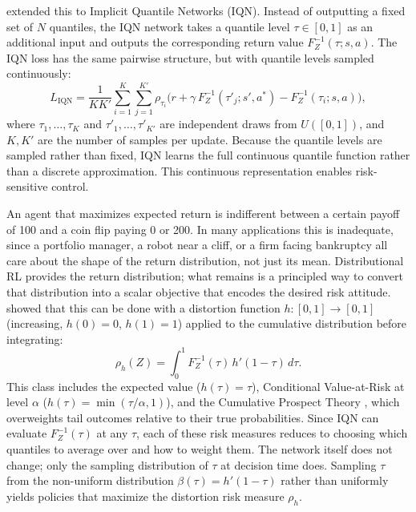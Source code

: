 \citet{Dabney2018b} extended this to Implicit Quantile Networks (IQN).
Instead of outputting a fixed set of $N$ quantiles, the IQN network takes
a quantile level $\tau \in [0,1]$ as an additional input and outputs the
corresponding return value $F_{Z}^{-1}(\tau; s,a)$. The IQN loss has
the same pairwise structure, but with quantile levels sampled
continuously:
\begin{equation}
  L_{\text{IQN}} = \frac{1}{KK'} \sum_{i=1}^{K} \sum_{j=1}^{K'}
  \rho_{\tau_i}\bigl(
    r + \gamma\, F_{Z}^{-1}(\tau'_j; s', a^*)
    - F_{Z}^{-1}(\tau_i; s, a)
  \bigr),
  \label{eq:iqn_loss}
\end{equation}
where $\tau_1, \ldots, \tau_K$ and $\tau'_1, \ldots, \tau'_{K'}$ are
independent draws from $U([0,1])$, and $K, K'$ are the number of
samples per update. Because the quantile levels are sampled rather than
fixed, IQN learns the full continuous quantile function rather than a
discrete approximation. This continuous representation enables risk-sensitive control.

An agent that maximizes expected return is indifferent between a certain
payoff of 100 and a coin flip paying 0 or 200. In many applications this
is inadequate, since a portfolio manager, a robot near a cliff, or a firm
facing bankruptcy all care about the shape of the return distribution, not
just its mean. Distributional RL provides the return distribution; what
remains is a principled way to convert that distribution into a scalar
objective that encodes the desired risk attitude. \citet{Yaari1987}
showed that this can be done with a distortion function
$h: [0,1] \to [0,1]$ (increasing, $h(0)=0$, $h(1)=1$) applied to the
cumulative distribution before integrating:
\begin{equation}
  \rho_h(Z) = \int_0^1 F_Z^{-1}(\tau) \, h'(1-\tau) \, d\tau.
  \label{eq:distortion_risk}
\end{equation}
This class includes the expected value ($h(\tau)=\tau$), Conditional
Value-at-Risk at level $\alpha$ ($h(\tau) = \min(\tau/\alpha, 1)$), and the
Cumulative Prospect Theory
\citep{TverskyKahneman1992}, which overweights tail outcomes relative to
their true probabilities. Since IQN can evaluate $F_Z^{-1}(\tau)$ at
any $\tau$, each of these risk measures reduces to choosing which quantiles
to average over and how to weight them. The network itself does not change;
only the sampling distribution of $\tau$ at decision time does. Sampling
$\tau$ from the non-uniform distribution $\beta(\tau) = h'(1-\tau)$ rather
than uniformly yields policies that maximize the distortion risk measure
$\rho_h$.

